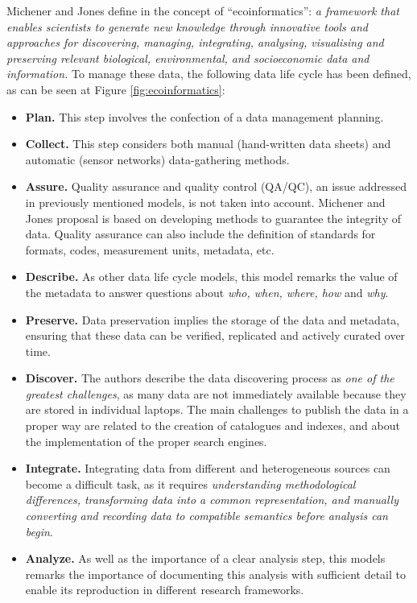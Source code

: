 Michener and Jones define in \cite{michener_ecoinformatics:_2012} the concept of ``ecoinformatics'': \textit{a framework that enables scientists to generate new knowledge through innovative tools and approaches for discovering, managing, integrating, analysing, visualising and preserving relevant biological, environmental, and socioeconomic data and information.} To manage these data, the following data life cycle has been defined, as can be seen at Figure \ref{fig:ecoinformatics}:
\begin{itemize}
    \item \textbf{Plan.} This step involves the confection of a data management planning.
    \item \textbf{Collect.} This step considers both manual (hand-written data sheets) and automatic (sensor networks) data-gathering methods.
    \item \textbf{Assure.} Quality assurance and quality control (QA/QC), an issue addressed in previously mentioned models, is not taken into account. Michener and Jones proposal is based on developing methods to guarantee the integrity of  data. Quality assurance can also include the definition of standards for formats, codes, measurement units, metadata, etc.
    \item \textbf{Describe.} As other data life cycle models, this model remarks the value of the metadata to answer questions about \textit{who, when, where, how} and \textit{why}.
    \item \textbf{Preserve.} Data preservation implies the storage of the data and metadata, ensuring that these data can be verified, replicated and actively curated over time.
    \item \textbf{Discover.} The authors describe the data discovering process as \textit{one of the greatest challenges}, as many data are not immediately available because they are stored in individual laptops. The main challenges to publish the data in a proper way are related to the creation of catalogues and indexes, and about the implementation of the proper search engines.
    \item \textbf{Integrate.} Integrating data from different and heterogeneous sources can become a difficult task, as it requires \textit{understanding methodological differences, transforming data into a common representation, and manually converting and recording data to compatible semantics before analysis can begin}.
    \item \textbf{Analyze.} As well as the importance of a clear analysis step, this models remarks the importance of documenting this analysis with sufficient detail to enable its reproduction in different research frameworks.
\end{itemize}

